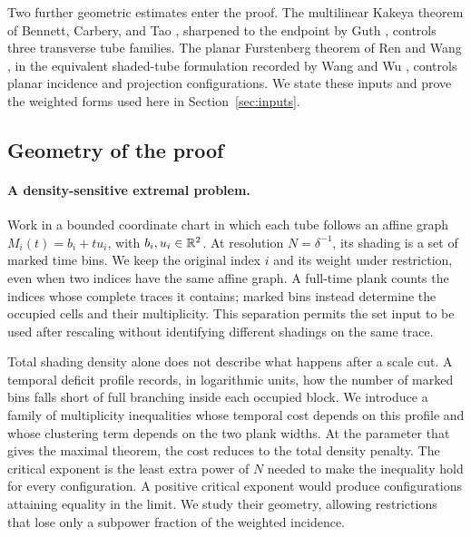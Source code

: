 Two further geometric estimates enter the proof. The multilinear
Kakeya theorem of Bennett, Carbery, and Tao
\citep[Theorem~1.15]{BCT2006}, sharpened to the endpoint by Guth
\citep[Theorem~1.3]{Guth2010}, controls three transverse tube families.
The planar Furstenberg theorem of Ren and Wang
\citep[Theorem~4.1]{RW2025}, in the equivalent shaded-tube formulation
recorded by Wang and Wu \citep[Theorem~0.6]{WW2024}, controls planar
incidence and projection configurations. We state these inputs and prove
the weighted forms used here in Section~\ref{sec:inputs}.

\subsection{Geometry of the proof}

\paragraph{A density-sensitive extremal problem.}
Work in a bounded coordinate chart in which each tube follows an affine
graph \(M_i(t)=b_i+t u_i\), with \(b_i,u_i\in\mathbb R^2\).
At resolution \(N=\delta^{-1}\), its shading is a set of marked time
bins. We keep the original index \(i\) and its weight under restriction,
even when two indices have the same affine graph. A full-time plank
counts the indices whose complete traces it contains; marked bins
instead determine the occupied cells and their multiplicity. This
separation permits the set input to be used after rescaling without
identifying different shadings on the same trace.

Total shading density alone does not describe what happens after a scale
cut. A temporal deficit profile records, in logarithmic units, how the
number of marked bins falls short of full branching inside each occupied
block. We introduce a family of
multiplicity inequalities whose temporal cost depends on this profile
and whose clustering term depends on the two plank widths. At the
parameter that gives the maximal theorem, the cost reduces to the total
density penalty. The critical exponent is the least extra power of
\(N\) needed to make the inequality hold for every configuration.
A positive critical exponent would produce configurations attaining
equality in the limit. We study their geometry, allowing restrictions
that lose only a subpower fraction of the weighted incidence.

